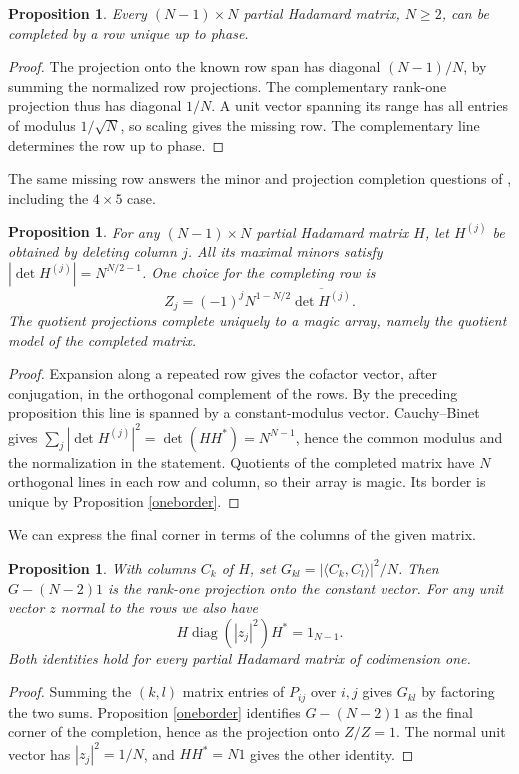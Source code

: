 \documentclass[11pt,a4paper]{article}
\newtheorem{prop}[thm]{Proposition}
\begin{document}
\begin{prop}
Every $(N-1)\times N$ partial Hadamard matrix, $N\geq2$, can be completed by a row unique up to phase.
\end{prop}
\begin{proof}
The projection onto the known row span has diagonal $(N-1)/N$, by summing the normalized row projections. The complementary rank-one projection thus has diagonal $1/N$. A unit vector spanning its range has all entries of modulus $1/\sqrt N$, so scaling gives the missing row. The complementary line determines the row up to phase.
\end{proof}

The same missing row answers the minor and projection completion questions of \cite{bs}, including the $4\times5$ case.

\begin{prop}\label{cofactor}
For any $(N-1)\times N$ partial Hadamard matrix $H$, let $H^{(j)}$ be obtained by deleting column $j$. All its maximal minors satisfy $|\det H^{(j)}|=N^{N/2-1}$. One choice for the completing row is
\[
 Z_j=(-1)^j N^{1-N/2}\overline{\det H^{(j)}} .
\]
The quotient projections complete uniquely to a magic array, namely the quotient model of the completed matrix.
\end{prop}
\begin{proof}
Expansion along a repeated row gives the cofactor vector, after conjugation, in the orthogonal complement of the rows. By the preceding proposition this line is spanned by a constant-modulus vector. Cauchy--Binet gives $\sum_j|\det H^{(j)}|^2=\det(HH^*)=N^{N-1}$, hence the common modulus and the normalization in the statement. Quotients of the completed matrix have $N$ orthogonal lines in each row and column, so their array is magic. Its border is unique by Proposition \ref{oneborder}.
\end{proof}

We can express the final corner in terms of the columns of the given matrix.

\begin{prop}
With columns $C_k$ of $H$, set $G_{kl}=|\langle C_k,C_l\rangle|^2/N$. Then $G-(N-2)1$ is the rank-one projection onto the constant vector. For any unit vector $z$ normal to the rows we also have
\[
 H\operatorname{diag}(|z_j|^2)H^*=1_{N-1}.
\]
Both identities hold for every partial Hadamard matrix of codimension one.
\end{prop}
\begin{proof}
Summing the $(k,l)$ matrix entries of $P_{ij}$ over $i,j$ gives $G_{kl}$ by factoring the two sums. Proposition \ref{oneborder} identifies $G-(N-2)1$ as the final corner of the completion, hence as the projection onto $Z/Z=1$. The normal unit vector has $|z_j|^2=1/N$, and $HH^*=N1$ gives the other identity.
\end{proof}
\end{document}
